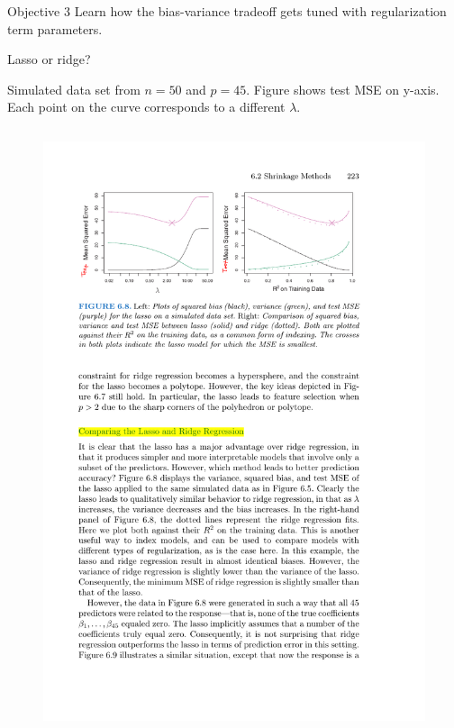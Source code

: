 \documentclass[mathserif, aspectratio=169]{beamer}
\begin{document}
\begin{frame}{Objective 3}
Learn how the bias-variance tradeoff gets tuned with regularization term parameters. 
\end{frame}

\begin{frame}{Lasso or ridge?}

Simulated data set from $n=50$ and $p=45$. Figure shows test MSE on y-axis.  Each point on the curve corresponds to a different $\lambda$.
\begin{columns}
\begin{figure}
\includegraphics[scale=1]{lasso-v-ridge-45variables}
\end{figure}

\vspace{-10mm}


\end{columns}
\end{frame}
\end{document}
